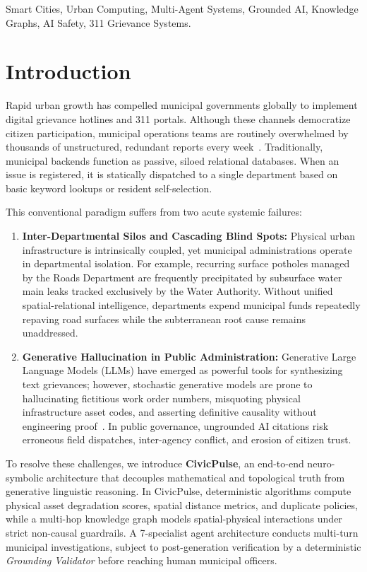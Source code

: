 \documentclass[conference]{IEEEtran}
\begin{document}
\begin{IEEEkeywords}
Smart Cities, Urban Computing, Multi-Agent Systems, Grounded AI, Knowledge Graphs, AI Safety, 311 Grievance Systems.
\end{IEEEkeywords}

\section{Introduction}
Rapid urban growth has compelled municipal governments globally to implement digital grievance hotlines and 311 portals. Although these channels democratize citizen participation, municipal operations teams are routinely overwhelmed by thousands of unstructured, redundant reports every week~\cite{b1, b2}. Traditionally, municipal backends function as passive, siloed relational databases. When an issue is registered, it is statically dispatched to a single department based on basic keyword lookups or resident self-selection.

This conventional paradigm suffers from two acute systemic failures:
\begin{enumerate}
    \item \textbf{Inter-Departmental Silos and Cascading Blind Spots:} Physical urban infrastructure is intrinsically coupled, yet municipal administrations operate in departmental isolation. For example, recurring surface potholes managed by the Roads Department are frequently precipitated by subsurface water main leaks tracked exclusively by the Water Authority. Without unified spatial-relational intelligence, departments expend municipal funds repeatedly repaving road surfaces while the subterranean root cause remains unaddressed.
    \item \textbf{Generative Hallucination in Public Administration:} Generative Large Language Models (LLMs) have emerged as powerful tools for synthesizing text grievances; however, stochastic generative models are prone to hallucinating fictitious work order numbers, misquoting physical infrastructure asset codes, and asserting definitive causality without engineering proof~\cite{b6}. In public governance, ungrounded AI citations risk erroneous field dispatches, inter-agency conflict, and erosion of citizen trust.
\end{enumerate}

To resolve these challenges, we introduce \textbf{CivicPulse}, an end-to-end neuro-symbolic architecture that decouples mathematical and topological truth from generative linguistic reasoning. In CivicPulse, deterministic algorithms compute physical asset degradation scores, spatial distance metrics, and duplicate policies, while a multi-hop knowledge graph models spatial-physical interactions under strict non-causal guardrails. A 7-specialist agent architecture conducts multi-turn municipal investigations, subject to post-generation verification by a deterministic \textit{Grounding Validator} before reaching human municipal officers.
\end{document}
